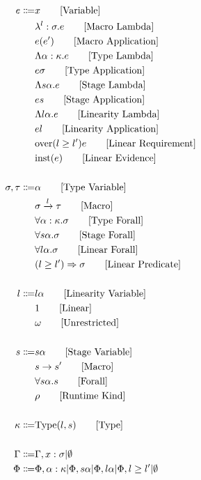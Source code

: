 \documentclass {article}
\begin{document}
\begin{align*}
e \Coloneqq & x \tag*{[Variable]}\\
& \lambda^l : \sigma. e \tag*{[Macro Lambda]}\\
& e(e') \tag*{[Macro Application]}\\
& \Lambda \alpha : \kappa. e \tag*{[Type Lambda]} \\
& e \sigma \tag*{[Type Application]} \\
& \Lambda s \alpha. e \tag*{[Stage Lambda]} \\
& e s \tag*{[Stage Application]} \\
& \Lambda l \alpha. e \tag*{[Linearity Lambda]} \\ 
& e l \tag*{[Linearity Application]} \\
& \text{over} (l \geq l') e \tag*{[Linear Requirement]}\\
& \text{inst} (e) \tag*{[Linear Evidence]}\\
\\
\sigma, \tau \Coloneqq & \alpha \tag* {[Type Variable]}\\
& \sigma \xrightarrow l \tau \tag*{[Macro]}\\
& \forall \alpha : \kappa. \sigma \tag*{[Type Forall]}\\ 
& \forall s \alpha. \sigma \tag*{[Stage Forall]}\\
& \forall l \alpha. \sigma \tag*{[Linear Forall]}\\
& (l \geq l') \Rightarrow \sigma \tag*{[Linear Predicate]}\\
\\
l \Coloneqq & l \alpha \tag*{[Linearity Variable]} \\ 
& 1 \tag*{[Linear]}\\
& \omega \tag*{[Unrestricted]}\\
\\
s \Coloneqq & s \alpha \tag*{[Stage Variable]}\\
& s \to s' \tag*{[Macro]} \\
& \forall s \alpha. s \tag*{[Forall]}\\
& \rho \tag*{[Runtime Kind]}\\
\\
\kappa \Coloneqq & \text{Type} (l,s) \tag*{[Type]}\\
\\
\Gamma \Coloneqq & \Gamma, x : \sigma | \emptyset \\
\Phi \Coloneqq & \Phi, \alpha : \kappa | \Phi, s \alpha | \Phi, l\alpha | \Phi, l \geq l' | \emptyset \\
\end{align*}
\end{document}
